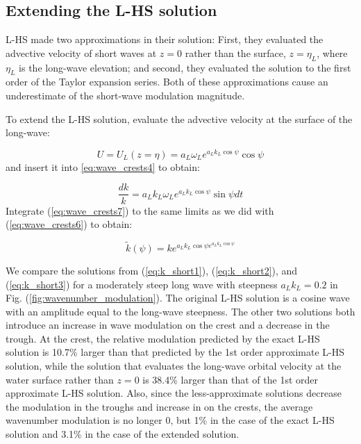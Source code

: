 \documentclass[draft]{agujournal2019}
\begin{document}
\subsection{Extending the L-HS solution}

L-HS made two approximations in their solution:
First, they evaluated the advective velocity of short waves at $z = 0$
rather than the surface, $z = \eta_L$, where $\eta_L$ is the long-wave
elevation; and second, they evaluated the solution to the first order
of the Taylor expansion series.
Both of these approximations cause an underestimate of the short-wave
modulation magnitude.

To extend the L-HS solution, evaluate the advective velocity at the surface
of the long-wave:

\begin{equation}
\label{eq:U_L2}
U = U_L(z=\eta) = a_L \omega_L e^{a_L k_L \cos{\psi}} \cos{\psi}
\end{equation}
and insert it into \ref{eq:wave_crests4} to obtain:

\begin{equation}
\label{eq:wave_crests7}
\dfrac{dk}{k} = a_L k_L \omega_L e^{a_L k_L \cos{\psi}} \sin{\psi} dt
\end{equation}
Integrate (\ref{eq:wave_crests7}) to the same limits as we did with
(\ref{eq:wave_crests6}) to obtain:

\begin{equation}
\label{eq:k_short3}
\widetilde{k}(\psi) = k e^{a_L k_L \cos{\psi} e^{a_L k_L \cos{\psi}}}
\end{equation}

We compare the solutions from (\ref{eq:k_short1}), (\ref{eq:k_short2}),
and (\ref{eq:k_short3}) for a moderately steep long wave with steepness
$a_L k_L = 0.2$ in Fig. (\ref{fig:wavenumber_modulation}).
The original L-HS solution is a cosine wave with an amplitude equal
to the long-wave steepness.
The other two solutions both introduce an increase in wave modulation
on the crest and a decrease in the trough.
At the crest, the relative modulation predicted by the exact L-HS solution
is 10.7\% larger than that predicted by the 1st order approximate L-HS
solution, while the solution that evaluates the long-wave orbital velocity
at the water surface rather than $z = 0$ is 38.4\% larger than that of the
1st order approximate L-HS solution.
Also, since the less-approximate solutions decrease the modulation in the
troughs and increase in on the crests, the average wavenumber modulation
is no longer 0, but 1\% in the case of the exact L-HS solution and 3.1\% in the
case of the extended solution.
\end{document}
